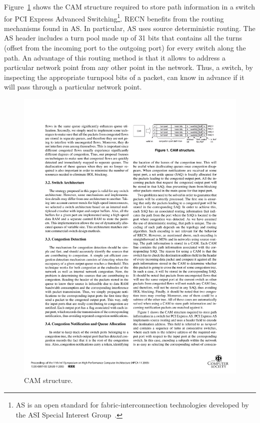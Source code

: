 Figure~\ref{fig:cam} shows the CAM structure required to store path information in a switch for PCI Express Advanced Switching\footnote{AS is an open standard for fabric-interconnection technologies developed by the ASI Special Interest Group~\cite{AS}.}. RECN benefits from the routing mechanisms found in AS. In particular, AS uses source deterministic routing. The AS header includes a turn pool made up of 31 bits that contains all the turns (offset from the incoming port to the outgoing port) for every switch along the path. An advantage of this routing method is that it allows to address a particular network point from any other point in the network. Thus, a switch, by inspecting the appropriate turnpool bits of a packet, can know in advance if it will pass through a particular network point.

\begin{figure}[ht]
	\centering
		\includegraphics[scale=1.2]{figures/cam.pdf}
		\caption{CAM structure.}
		\label{fig:cam}
\end{figure}


